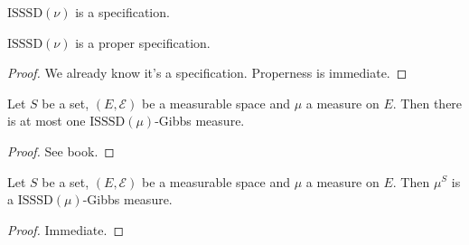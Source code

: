 \begin{definition}
    \label{def:isssd-specification}
    \leanok

    $\text{ISSSD}(\nu)$ is a specification.
\end{definition}

\begin{lemma}
    \label{lem:isssd-proper-specification}
    \leanok

    $\text{ISSSD}(\nu)$ is a proper specification.
\end{lemma}
\begin{proof}

    We already know it's a specification. Properness is immediate.
\end{proof}

\begin{lemma}
    \label{lem:gibbs-measure-uniqueness}

    Let $S$ be a set, $(E, \mathcal{E})$ be a measurable space and $\mu$ a measure on $E$. Then there is at most one $\text{ISSSD}(\mu)$-Gibbs measure.
\end{lemma}
\begin{proof}

    See book.
\end{proof}

\begin{lemma}
    \label{lem:gibbs-measure-existence}

    Let $S$ be a set, $(E, \mathcal{E})$ be a measurable space and $\mu$ a measure on $E$. Then $\mu^S$ is a $\text{ISSSD}(\mu)$-Gibbs measure.
\end{lemma}
\begin{proof}

   Immediate.
\end{proof}
